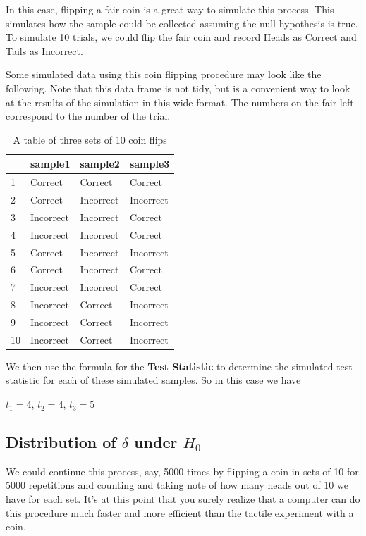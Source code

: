 \documentclass[]{tufte-book}
\begin{document}
In this case, flipping a fair coin is a great way to simulate this
process. This simulates how the sample could be collected assuming the
null hypothesis is true. To simulate 10 trials, we could flip the fair
coin and record Heads as Correct and Tails as Incorrect.

Some simulated data using this coin flipping procedure may look like the
following. Note that this data frame is not tidy, but is a convenient
way to look at the results of the simulation in this wide format. The
numbers on the fair left correspond to the number of the trial.

\begin{table}

\caption{\label{tab:sample-table}A table of three sets of 10 coin flips}
\centering
\begin{tabular}[t]{l|l|l|l}
\hline
  & sample1 & sample2 & sample3\\
\hline
1 & Correct & Correct & Correct\\
\hline
2 & Correct & Incorrect & Incorrect\\
\hline
3 & Incorrect & Incorrect & Correct\\
\hline
4 & Incorrect & Incorrect & Correct\\
\hline
5 & Correct & Incorrect & Incorrect\\
\hline
6 & Correct & Incorrect & Correct\\
\hline
7 & Incorrect & Incorrect & Correct\\
\hline
8 & Incorrect & Correct & Incorrect\\
\hline
9 & Incorrect & Correct & Incorrect\\
\hline
10 & Incorrect & Correct & Incorrect\\
\hline
\end{tabular}
\end{table}

We then use the formula for the \textbf{Test Statistic} to determine the
simulated test statistic for each of these simulated samples. So in this
case we have

\(t_1 = 4\), \(t_2 = 4\), \(t_3 = 5\)

\subsection{\texorpdfstring{Distribution of \(\delta\) under
\(H_0\)}{Distribution of \textbackslash{}delta under H\_0}}\label{distribution-of-delta-under-h_0}

We could continue this process, say, 5000 times by flipping a coin in
sets of 10 for 5000 repetitions and counting and taking note of how many
heads out of 10 we have for each set. It's at this point that you surely
realize that a computer can do this procedure much faster and more
efficient than the tactile experiment with a coin.
\end{document}
